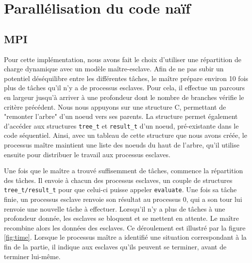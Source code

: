\documentclass[12pt]{article}
\begin{document}
\section{Parallélisation du code naïf}
    \subsection{MPI}
    Pour cette implémentation, nous avons fait le choix d'utiliser une 
    répartition de charge dynamique avec un modèle maître-esclave.
    Afin de ne pas subir un potentiel déséquilibre entre les différentes
    tâches, le maître prépare environ 10 fois plus de tâches qu'il n'y a
    de processus esclaves. Pour cela, il effectue un parcours en largeur
    jusqu'à arriver à une profondeur dont le nombre de branches vérifie le
    critère précédent. Nous nous appuyons sur une structure C, permettant de
    "remonter l'arbre" d'un noeud vers ses parents. La structure permet
    également d'accéder aux structures \texttt{tree\_t} et \texttt{result\_t}
    d'un noeud, pré-existante dans le code séquentiel.
    Ainsi, avec un tableau de cette structure que nous avons créée, le 
    processus maître maintient une liste des noeuds du haut de l'arbre,
    qu'il utilise ensuite pour distribuer le travail aux processus esclaves.\\
    \par Une fois que le maître a trouvé suffisemment de tâches, commence la
    répartition des tâches. Il envoie à chacun des processus esclaves, un
    couple de structures \texttt{tree\_t/result\_t} pour que celui-ci puisse
    appeler \texttt{evaluate}. Une fois sa tâche finie, un processus esclave 
    renvoie son résultat au processus 0, qui a son tour lui renvoie une
    nouvelle tâche à effectuer. Lorsqu'il n'y a plus de tâches à une profondeur
    donnée, les esclaves se bloquent et se mettent en attente. Le maître
    recombine alors les données des esclaves. Ce déroulement est illustré par
    la figure \ref{fig:time}. Lorsque le processus maître a identifié une
    situation correspondant à la fin de la partie, il indique aux esclaves
    qu'ils peuvent se terminer, avant de terminer lui-même.
\end{document}
